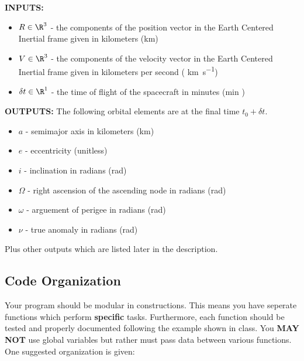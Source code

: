 \documentclass[11pt, reqno]{article}    %
\begin{document}
\noindent \textbf{INPUTS:}
\begin{itemize}
    \item \( R \in \R^{3} \) - the components of the position vector in the Earth Centered Inertial frame given in kilometers (\si{\kilo\meter})
    \item \( V \in \R^{3} \) - the components of the velocity vector in the Earth Centered Inertial frame given in kilometers per second ( \si{\kilo\meter\per\second})
    \item \( \delta t \in \R^{1} \) - the time of flight of the spacecraft in minutes (\si{\minute} )
\end{itemize}

\noindent \textbf{OUTPUTS:}
The following orbital elements are at the final time \( t_0 + \delta t \).
\begin{itemize}
    \item \( a \)  - semimajor axis in kilometers (\si{\kilo\meter})
    \item \( e \) - eccentricity (unitless)
    \item \( i \) - inclination in radians (\si{\radian})
    \item \( \Omega \) - right ascension of the ascending node in radians (\si{\radian})
    \item \( \omega \) - arguement of perigee in radians (\si{\radian})
    \item \( \nu \) - true anomaly in radians (\si{\radian})
\end{itemize}
Plus other outputs which are listed later in the description.

\subsection*{Code Organization} 
Your program should be modular in constructions. 
This means you have seperate functions which perform \textbf{specific} tasks.
Furthermore, each function should be tested and properly documented following the example shown in class.
You \textbf{MAY NOT}  use global variables but rather must pass data between various functions.
One suggested organization is given:
\end{document}
